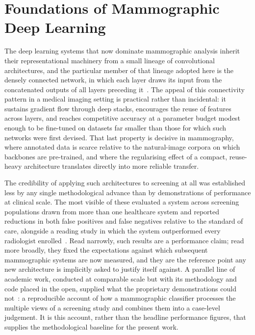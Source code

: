 \documentclass[12pt, a4paper]{article}
\begin{document}
\section{Foundations of Mammographic Deep Learning}

The deep learning systems that now dominate mammographic analysis inherit
their representational machinery from a small lineage of convolutional
architectures, and the particular member of that lineage adopted here is
the densely connected network, in which each layer draws its input from the
concatenated outputs of all layers preceding it~\cite{Huang2017}. The
appeal of this connectivity pattern in a medical imaging setting is
practical rather than incidental: it sustains gradient flow through deep
stacks, encourages the reuse of features across layers, and reaches
competitive accuracy at a parameter budget modest enough to be fine-tuned
on datasets far smaller than those for which such networks were first
devised. That last property is decisive in mammography, where annotated
data is scarce relative to the natural-image corpora on which backbones are
pre-trained, and where the regularising effect of a compact, reuse-heavy
architecture translates directly into more reliable transfer.

The credibility of applying such architectures to screening at all was
established less by any single methodological advance than by demonstrations
of performance at clinical scale. The most visible of these evaluated a
system across screening populations drawn from more than one healthcare
system and reported reductions in both false positives and false negatives
relative to the standard of care, alongside a reading study in which the
system outperformed every radiologist enrolled~\cite{McKinney2020}. Read
narrowly, such results are a performance claim; read more broadly, they
fixed the expectations against which subsequent mammographic systems are
now measured, and they are the reference point any new architecture is
implicitly asked to justify itself against. A parallel line of academic
work, conducted at comparable scale but with its methodology and code
placed in the open, supplied what the proprietary demonstrations could
not~\cite{Wu2019}: a reproducible account of how a mammographic classifier
processes the multiple views of a screening study and combines them into a
case-level judgement. It is this account, rather than the headline
performance figures, that supplies the methodological baseline for the
present work.
\end{document}
